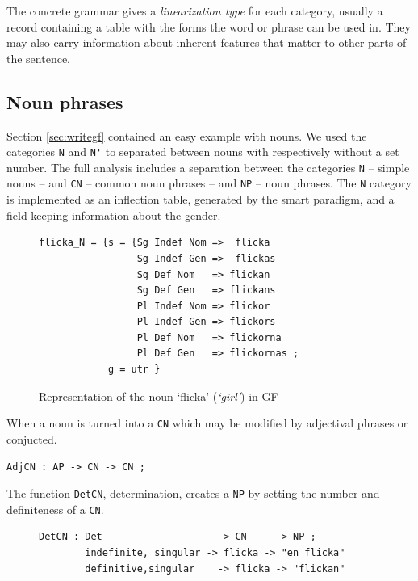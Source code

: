 \documentclass{report}
\begin{document}
The concrete grammar gives a \textit{linearization type} for each category,
usually a record containing a table with the forms the word or phrase can be used in.
They may also
carry information about inherent features that matter to other parts of the sentence.

           
\subsection{Noun phrases}
Section \ref{sec:writegf} contained an easy example with nouns. We used the categories \verb-N-
and \verb-N'- to separated between nouns with respectively without a set number.
The full analysis includes a separation between the categories \verb-N- -- simple nouns --
and 
\verb-CN- -- common noun phrases -- and \verb-NP- -- noun phrases.
The \verb-N- category is implemented as an inflection table, generated by the smart paradigm,
and a field keeping information about the gender.
\begin{figure}[h]
\begin{verbatim}
flicka_N = {s = {Sg Indef Nom =>  flicka
                 Sg Indef Gen =>  flickas
                 Sg Def Nom   => flickan
                 Sg Def Gen   => flickans
                 Pl Indef Nom => flickor
                 Pl Indef Gen => flickors
                 Pl Def Nom   => flickorna
                 Pl Def Gen   => flickornas ;
            g = utr }
\end{verbatim}
\caption{Representation of the noun `flicka' (\emph{`girl'}) in GF}
\label{fig:gfpic}
\end{figure}
When a noun is turned into a \verb-CN- %
which may be modified by adjectival phrases or conjucted.
\begin{verbatim}
AdjCN : AP -> CN -> CN ; 
\end{verbatim}
The function \verb-DetCN-, determination, creates a
\verb-NP- by setting the number and definiteness of a \verb-CN-.

\begin{figure}[h]
\begin{verbatim}
DetCN : Det                    -> CN     -> NP ;
        indefinite, singular -> flicka -> "en flicka"
        definitive,singular    -> flicka -> "flickan"
\end{verbatim}        
\caption{}
\label{gfcode:DetCN}
\end{figure}
\end{document}
